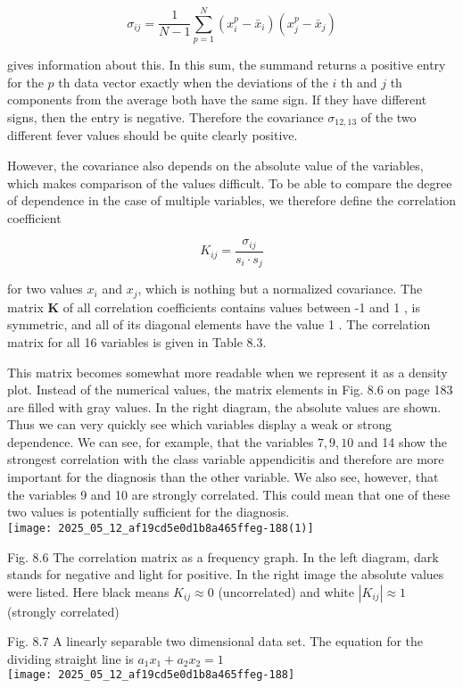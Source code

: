 \documentclass[10pt]{article}
\begin{document}
$$
\sigma_{i j}=\frac{1}{N-1} \sum_{p=1}^{N}\left(x_{i}^{p}-\bar{x}_{i}\right)\left(x_{j}^{p}-\bar{x}_{j}\right)
$$

gives information about this. In this sum, the summand returns a positive entry for the $p$ th data vector exactly when the deviations of the $i$ th and $j$ th components from the average both have the same sign. If they have different signs, then the entry is negative. Therefore the covariance $\sigma_{12,13}$ of the two different fever values should be quite clearly positive.

However, the covariance also depends on the absolute value of the variables, which makes comparison of the values difficult. To be able to compare the degree of dependence in the case of multiple variables, we therefore define the correlation coefficient

$$
K_{i j}=\frac{\sigma_{i j}}{s_{i} \cdot s_{j}}
$$

for two values $x_{i}$ and $x_{j}$, which is nothing but a normalized covariance. The matrix $\boldsymbol{K}$ of all correlation coefficients contains values between -1 and 1 , is symmetric, and all of its diagonal elements have the value 1 . The correlation matrix for all 16 variables is given in Table 8.3.

This matrix becomes somewhat more readable when we represent it as a density plot. Instead of the numerical values, the matrix elements in Fig. 8.6 on page 183 are filled with gray values. In the right diagram, the absolute values are shown. Thus we can very quickly see which variables display a weak or strong dependence. We can see, for example, that the variables $7,9,10$ and 14 show the strongest correlation with the class variable appendicitis and therefore are more important for the diagnosis than the other variable. We also see, however, that the variables 9 and 10 are strongly correlated. This could mean that one of these two values is potentially sufficient for the diagnosis.\\
\texttt{[image: 2025\_05\_12\_af19cd5e0d1b8a465ffeg-188(1)]}

Fig. 8.6 The correlation matrix as a frequency graph. In the left diagram, dark stands for negative and light for positive. In the right image the absolute values were listed. Here black means $K_{i j} \approx 0$ (uncorrelated) and white $\left|K_{i j}\right| \approx 1$ (strongly correlated)

Fig. 8.7 A linearly separable two dimensional data set. The equation for the dividing straight line is $a_{1} x_{1}+a_{2} x_{2}=1$\\
\texttt{[image: 2025\_05\_12\_af19cd5e0d1b8a465ffeg-188]}
\end{document}
